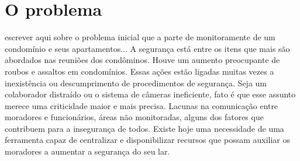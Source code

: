 \chapter{O problema}

escrever aqui sobre o problema inicial que a parte de monitoramente de um condomínio e seus apartamentos...
A segurança está entre os itens que mais são abordados nas reuniões dos condôminos. Houve um aumento preocupante de roubos e assaltos em condomínios. Essas ações estão ligadas muitas vezes a inexistência ou descumprimento de procedimentos de segurança. Seja um colaborador distraído ou o sistema de câmeras ineficiente, fato é que esse assunto merece uma criticidade maior e mais precisa.
Lacunas na comunicação entre moradores e funcionários, áreas não monitoradas, alguns dos fatores que contribuem para a insegurança de todos. Existe hoje uma necessidade de uma ferramenta capaz de centralizar e disponibilizar recursos que possam auxiliar os moradores a aumentar a segurança do seu lar.
